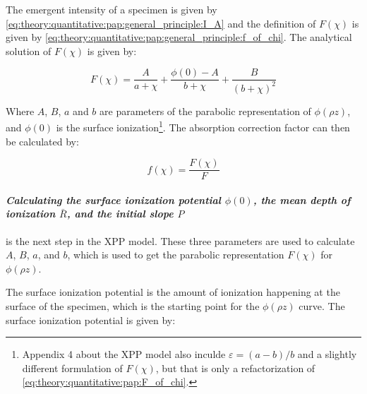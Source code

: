 The emergent intensity of a specimen is given by \cref{eq:theory:quantitative:pap:general_principle:I_A} and the definition of $F(\chi)$ is given by \cref{eq:theory:quantitative:pap:general_principle:f_of_chi}. The analytical solution of $F(\chi)$ is given by:



\begin{equation}
    \label{eq:theory:quantitative:pap:F_of_chi}
    F(\chi) = \frac{A}{a+ \chi} + \frac{\phi(0) - A}{b + \chi} + \frac{B}{(b + \chi)^2}
\end{equation}

Where $A$, $B$, $a$ and $b$ are parameters of the parabolic representation of $\phi(\rho z)$, and $\phi(0)$ is the surface ionization\footnote{Appendix 4 about the XPP model also inculde $\varepsilon = (a-b)/b$ and a slightly different formulation of $F(\chi)$, but that is only a refactorization of \cref{eq:theory:quantitative:pap:F_of_chi}.}. The absorption correction factor can then be calculated by:

\begin{equation}
    \label{eq:theory:quantitative:pap:absorption_correction}
    f(\chi) = \frac{F(\chi)}{F}
\end{equation}







\paragraph*{\emph{Calculating the surface ionization potential $\phi(0)$, the mean depth of ionization $\bar{R}$, and the initial slope $P$}} is the next step in the XPP model.
These three parameters are used to calculate $A$, $B$, $a$, and $b$, which is used to get the parabolic representation $F(\chi)$ for $\phi(\rho z)$.


The surface ionization potential is the amount of ionization happening at the surface of the specimen, which is the starting point for the $\phi(\rho z)$ curve. The surface ionization potential is given by:

